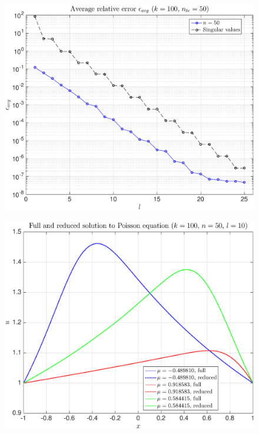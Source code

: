 \documentclass[11pt,a4paper]{article}
\theoremstyle{definition}
\theoremstyle{theorem}
\numberwithin{equation}{section}
\begin{document}
	\begin{figure}[H]
		\center
		\includegraphics[scale = 0.5]{fig20}
		\caption{}
	\end{figure}
	
	\begin{figure}[H]
		\center
		\includegraphics[scale = 0.5]{fig21}
		\caption{}
	\end{figure}
	
\end{document}
